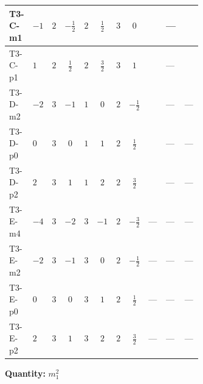 \documentclass[8pt]{article}
\begin{document}
\begin{landscape}
\begin{longtable}{@{}llcccccc >{\raggedright\arraybackslash}p{0.21\linewidth} >{\raggedright\arraybackslash}p{0.21\linewidth} >{\raggedright\arraybackslash}p{0.21\linewidth}@{}}
\midrule
T3-C-m1 & $-1$ & $2$ & $-\frac{1}{2}$ & $2$ & $\frac{1}{2}$ & $3$ & $0$ & \scriptsize\adjustbox{max width=\linewidth}{$\begin{gathered} +4 {\lambda_{12}^{(1)}} {m_2^2}\end{gathered}$} & --- & \scriptsize\adjustbox{max width=\linewidth}{$\begin{gathered} -\frac{9 {g_2}^2 {m_1^2}}{2}\end{gathered}$} \\
\midrule
T3-C-p1 & $1$ & $2$ & $\frac{1}{2}$ & $2$ & $\frac{3}{2}$ & $3$ & $1$ & \scriptsize\adjustbox{max width=\linewidth}{$\begin{gathered} +4 {\lambda_{12}^{(1)}} {m_2^2}\end{gathered}$} & --- & \scriptsize\adjustbox{max width=\linewidth}{$\begin{gathered} -\frac{9 {g_2}^2 {m_1^2}}{2}\end{gathered}$} \\
\midrule
T3-D-m2 & $-2$ & $3$ & $-1$ & $1$ & $0$ & $2$ & $-\frac{1}{2}$ & \scriptsize\adjustbox{max width=\linewidth}{$\begin{gathered} +2 {\lambda_{12}^{(1)}} {m_2^2}\end{gathered}$} & --- & --- \\
\midrule
T3-D-p0 & $0$ & $3$ & $0$ & $1$ & $1$ & $2$ & $\frac{1}{2}$ & \scriptsize\adjustbox{max width=\linewidth}{$\begin{gathered} +2 {\lambda_{12}^{(1)}} {m_2^2}\end{gathered}$} & --- & --- \\
\midrule
T3-D-p2 & $2$ & $3$ & $1$ & $1$ & $2$ & $2$ & $\frac{3}{2}$ & \scriptsize\adjustbox{max width=\linewidth}{$\begin{gathered} +2 {\lambda_{12}^{(1)}} {m_2^2}\end{gathered}$} & --- & --- \\
\midrule
T3-E-m4 & $-4$ & $3$ & $-2$ & $3$ & $-1$ & $2$ & $-\frac{3}{2}$ & --- & --- & --- \\
\midrule
T3-E-m2 & $-2$ & $3$ & $-1$ & $3$ & $0$ & $2$ & $-\frac{1}{2}$ & --- & --- & --- \\
\midrule
T3-E-p0 & $0$ & $3$ & $0$ & $3$ & $1$ & $2$ & $\frac{1}{2}$ & --- & --- & --- \\
\midrule
T3-E-p2 & $2$ & $3$ & $1$ & $3$ & $2$ & $2$ & $\frac{3}{2}$ & --- & --- & --- \\
\midrule
\bottomrule
\end{longtable}
\clearpage
\noindent\textbf{Quantity: }$m_1^2$\par\smallskip

\end{landscape}
\end{document}
